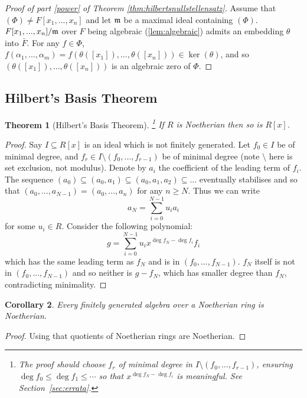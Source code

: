 \documentclass[12pt]{article}
\theoremstyle{plain}
\newtheorem{thm}{Theorem}[subsection] %
\newtheorem{cor}[thm]{Corollary}
\theoremstyle{definition}
\begin{document}
\begin{proof}[Proof of part \ref{power} of Theorem \ref{thm:hilbertsnullstellensatz}]
Assume that $(\Phi) \neq F[x_1,...,x_n]$ and let $\frak{m}$ be a maximal ideal containing $(\Phi)$. $F[x_1,...,x_n]/\frak{m}$ over $F$ being algebraic (\ref{lem:algebraic}) admits an embedding $\theta$ into $\bar{F}$. For any $f \in \Phi$, $f(\alpha_1,...,\alpha_m) = f(\theta([x_1]),...,\theta([x_n])) \in \operatorname{ker}(\theta)$, and so $(\theta([x_1]),...,\theta([x_n]))$ is an algebraic zero of $\Phi$.
\end{proof}
%
\subsection{Hilbert's Basis Theorem}
\begin{thm}[Hilbert's Basis Theorem]\footnote{The proof should choose $f_r$ of minimal degree in $I\setminus(f_0,\ldots,f_{r-1})$, ensuring $\deg f_0\le\deg f_1\le\cdots$ so that $x^{\deg f_N - \deg f_i}$ is meaningful. See Section~\ref{sec:errata}.}
If $R$ is Noetherian then so is $R[x]$.
\end{thm}
\begin{proof}
Say $I \subseteq R[x]$ is an ideal which is not finitely generated. Let $f_0 \in I$ be of minimal degree, and $f_r \in I\setminus(f_0,...,f_{r-1})$ be of minimal degree (note $\setminus$ here is set exclusion, not modulus). Denote by $a_i$ the coefficient of the leading term of $f_i$. The sequence $(a_0) \subseteq (a_0,a_1) \subseteq (a_0,a_1,a_2) \subseteq \hdots$ eventually stabilises and so that $(a_0,...,a_{N-1}) = (a_0,...,a_n)$ for any $n \geq N$. Thus we can write
\[a_N = \sum_{i = 0}^{N-1}u_i a_i\]
for some $u_i \in R$. Consider the following polynomial:
\[g = \sum_{i = 0}^{N-1}u_ix^{\operatorname{deg}f_N - \operatorname{deg}f_i}f_i\]
which has the same leading term as $f_N$ and is in $(f_0,...,f_{N-1})$. $f_N$ itself is not in $(f_0,...,f_{N-1})$ and so neither is $g - f_{N}$, which has smaller degree than $f_{N}$, contradicting minimality.
\end{proof}
\begin{cor}
Every finitely generated algebra over a Noetherian ring is Noetherian.
\end{cor}
\begin{proof}
Using that quotients of Noetherian rings are Noetherian.
\end{proof}
%
\end{document}
